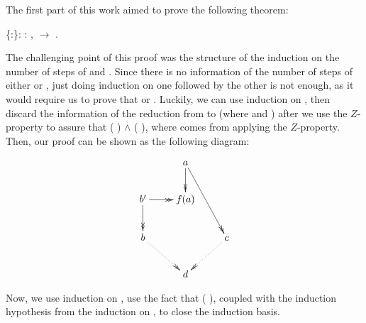 \documentclass{llncs}
\begin{document}
The first part of this work aimed to prove the following theorem:

\begin{coqdoccode}
\coqdocnoindent
{}  \{:\}: \coqdockw{\ensuremath{\forall}} :  ,   \ensuremath{\rightarrow}  .\coqdoceol
\end{coqdoccode}
  
The challenging point of this proof was the structure of the induction on the number of steps of     and    . Since there is no information of the number of steps of either     or    , just doing induction on one followed by the other is not enough, as it would require us to prove that     or    . Luckily, we can use induction on    , then discard the information of the reduction from  to  (where    and    ) after we use the $Z$-property to assure that    ( ) \ensuremath{\land}    ( ), where   comes from applying the $Z$-property. Then, our proof can be shown as the following diagram:

\[
  \xymatrix{
    & a \ar@{->>}[d] \ar@{->>}[rdd] & \\
    b' \ar@{->>}[r] \ar @{->>}[d] & f(a) &  \\
    b \ar @{.>>}[dr] & & c \ar@{.>>}[ld] \\
    & d &
  }
\]

Now, we use induction on    , use the fact that    ( ), coupled with the induction hypothesis from the induction on    , to close the induction basis.
\end{document}
